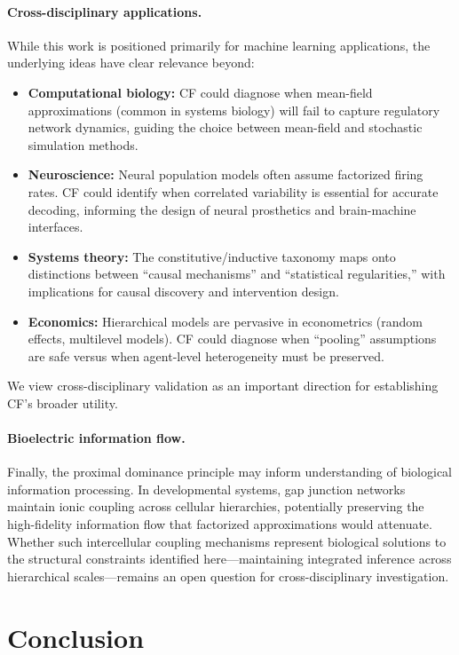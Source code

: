 \documentclass[10pt]{article} %
\theoremstyle{plain}
\theoremstyle{definition}
\begin{document}
\paragraph{Cross-disciplinary applications.} While this work is positioned primarily for machine learning applications, the underlying ideas have clear relevance beyond:
\begin{itemize}
    \item \textbf{Computational biology:} CF could diagnose when mean-field approximations (common in systems biology) will fail to capture regulatory network dynamics, guiding the choice between mean-field and stochastic simulation methods.
    \item \textbf{Neuroscience:} Neural population models often assume factorized firing rates. CF could identify when correlated variability is essential for accurate decoding, informing the design of neural prosthetics and brain-machine interfaces.
    \item \textbf{Systems theory:} The constitutive/inductive taxonomy maps onto distinctions between ``causal mechanisms'' and ``statistical regularities,'' with implications for causal discovery and intervention design.
    \item \textbf{Economics:} Hierarchical models are pervasive in econometrics (random effects, multilevel models). CF could diagnose when ``pooling'' assumptions are safe versus when agent-level heterogeneity must be preserved.
\end{itemize}
We view cross-disciplinary validation as an important direction for establishing CF's broader utility.

\paragraph{Bioelectric information flow.} Finally, the proximal dominance principle may inform understanding of biological information processing. In developmental systems, gap junction networks maintain ionic coupling across cellular hierarchies, potentially preserving the high-fidelity information flow that factorized approximations would attenuate. Whether such intercellular coupling mechanisms represent biological solutions to the structural constraints identified here---maintaining integrated inference across hierarchical scales---remains an open question for cross-disciplinary investigation.

\section{Conclusion}
\label{sec:conclusion}
\end{document}
